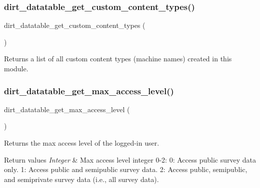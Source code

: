 \subsubsection{\texorpdfstring{dirt\+\_\+datatable\+\_\+get\+\_\+custom\+\_\+content\+\_\+types()}{dirt\_datatable\_get\_custom\_content\_types()}}
{\footnotesize\ttfamily dirt\+\_\+datatable\+\_\+get\+\_\+custom\+\_\+content\+\_\+types (\begin{DoxyParamCaption}{ }\end{DoxyParamCaption})}

Returns a list of all custom content types (machine names) created in this module. \mbox{\label{dirt__datatable_8module_a71162f38451c9cc9fe97f09fe6190b60}} 
\subsubsection{\texorpdfstring{dirt\+\_\+datatable\+\_\+get\+\_\+max\+\_\+access\+\_\+level()}{dirt\_datatable\_get\_max\_access\_level()}}
{\footnotesize\ttfamily dirt\+\_\+datatable\+\_\+get\+\_\+max\+\_\+access\+\_\+level (\begin{DoxyParamCaption}{ }\end{DoxyParamCaption})}

Returns the max access level of the logged-\/in user.


\begin{DoxyRetVals}{Return values}
{\em Integer} & Max access level integer 0-\/2\+: 0\+: Access public survey data only. 1\+: Access public and semipublic survey data. 2\+: Access public, semipublic, and semiprivate survey data (i.\+e., all survey data). \\
\hline
\end{DoxyRetVals}
\mbox{\label{dirt__datatable_8module_a78cbe7fb6141364c2178c147c1472a40}} 
